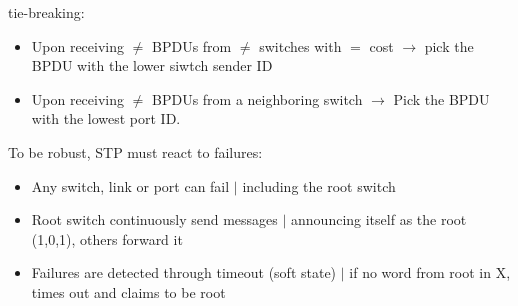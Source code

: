 \documentclass[a4paper, fontsize=8pt, landscape, DIV=1]{scrartcl}
\begin{document}
\begin{multicols*}{4}
		tie-breaking: 
		\vspace{-0.2cm}
		\begin{itemize}[noitemsep]
			\item Upon receiving $\ne$ BPDUs from $\ne$ switches with $=$ cost
			$\rightarrow$ pick the BPDU with the lower siwtch sender ID
			\item Upon receiving $\ne$ BPDUs from a neighboring switch $\rightarrow$
			Pick the BPDU with the lowest port ID. 
		\end{itemize}
		To be robust, STP must react to failures: 
		\vspace{-0.2cm}
		\begin{itemize}[noitemsep]
			\item Any switch, link or port can fail $\vert$ including the root switch
			\item Root switch continuously send messages $\vert$ announcing itself as
			the root (1,0,1), others forward it
			\item Failures are detected through timeout (soft state) $\vert$ if no
			word from root in X, times out and claims to be root 
		\end{itemize}

\end{multicols*}
\end{document}
